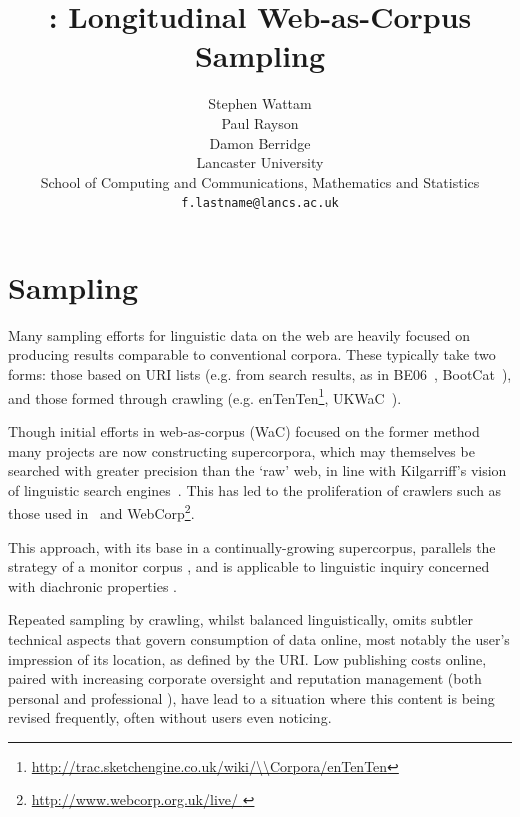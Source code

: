 \documentclass[11pt]{article}
\title{\toolname: Longitudinal Web-as-Corpus Sampling}
\author{Stephen Wattam\superscript{1}\\\And
  Paul Rayson\superscript{1}\\\And
  Damon Berridge\superscript{2}\\\AND
  Lancaster University\\
  School of Computing and Communications\superscript{1}, Mathematics and Statistics\superscript{2}\\
  {\tt f.lastname@lancs.ac.uk}\\
}
\date{}
\newcommand{\citefn}[1]{\footnote{#1}}
\begin{document}
\maketitle

\section{Sampling}

Many sampling efforts for linguistic data on the web are heavily focused on producing results comparable to conventional corpora.  These typically take two forms: those based on URI lists (e.g. from search results, as in %
BE06~\cite{baker2009be06}, BootCat~\cite{baroni2004bootcat}), and those formed through crawling (e.g. enTenTen\citefn{\url{http://trac.sketchengine.co.uk/wiki/\\Corpora/enTenTen}}, %
UKWaC~\cite{ferraresi2008introducing}).

Though initial efforts in web-as-corpus (WaC) focused on the former method %
many projects are now constructing supercorpora, which may themselves be searched with greater precision than the `raw' web, in line with Kilgarriff's vision of linguistic search engines~\cite{kilgarriff2003linguistic}.  This has led to the proliferation of crawlers such as those used in~\cite{schafer8building} and WebCorp\citefn{\url{http://www.webcorp.org.uk/live/
}}.%


This approach, with its base in a continually-growing supercorpus, parallels the strategy of a monitor corpus%
, and is applicable to linguistic inquiry concerned with diachronic properties%
.


Repeated sampling by crawling, whilst balanced linguistically, omits subtler technical aspects that govern consumption of data online, most notably the user's impression of its location, as defined by the URI.  Low publishing costs online, paired with increasing corporate oversight and reputation management (both personal %
and professional%
), have lead to a situation where this content is being revised frequently, often without users even noticing.
\end{document}
